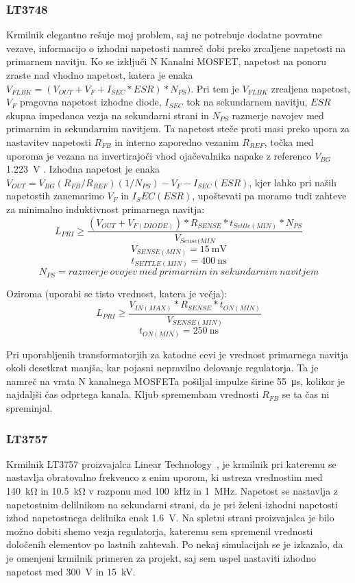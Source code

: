 \documentclass[a4paper,twoside,openright,12pt,Slovene]{book}
\begin{document}
	\subsubsection{LT3748} \label{LT3748}
Krmilnik elegantno rešuje moj problem, saj ne potrebuje dodatne povratne vezave, informacijo o izhodni napetosti namreč dobi preko zrcaljene napetosti na primarnem navitju. Ko se izključi N Kanalni MOSFET, napetost na ponoru zraste nad vhodno napetost, katera je enaka \(V_{FLBK} = (V_{OUT} + V_F + I_{SEC} * ESR) * N_{PS}) \). Pri tem je \(V_{FLBK}\) zrcaljena napetost, \(V_F\) pragovna napetost izhodne diode, \(I_{SEC}\) tok na sekundarnem navitju, \(ESR\) skupna impedanca vezja na sekundarni strani in \(N_{PS}\) razmerje navojev med primarnim in sekundarnim navitjem. Ta napetost steče proti masi preko upora za nastavitev napetosti \(R_{FB}\) in interno zaporedno vezanim \(R_{REF}\), točka med uporoma je vezana na invertirajoči vhod ojačevalnika napake z referenco \(V_{BG}\) \SI{1.223}{\volt} \cite{analog:LT3748}. Izhodna napetost je enaka \(V_{OUT} = V_{BG}(R_{FB} / R_{REF})(1 / N_{PS}) - V_F - I_{SEC} (ESR)\), kjer lahko pri naših napetostih zanemarimo \(V_F\) in \(I_SEC (ESR)\), upoštevati pa moramo tudi zahteve za minimalno induktivnost primarnega navitja:
\[L_{PRI} \geq \frac{(V_{OUT}+V_{F(DIODE)}) * R_{SENSE} * t_{Settle(MIN)} * N_{PS}}{V_{Sense(MIN}}\]
\[V_{SENSE(MIN)}=\SI{15}{\milli\volt}\]
\[t_{SETTLE(MIN)}=\SI{400}{\nano\second}\]
\[N_{PS}=razmerje \: ovojev \: med \: primarnim \: in \: sekundarnim \: navitjem \]

Oziroma (uporabi se tisto vrednost, katera je večja):
\[L_{PRI} \geq \frac{V_{IN(MAX)}*R_{SENSE}*t_{ON(MIN)}}{V_{SENSE(MIN)}}\]
\[t_{ON(MIN)}=\SI{250}{\nano\second}\]

Pri uporabljenih transformatorjih za katodne cevi je vrednost primarnega navitja okoli desetkrat manjša, kar pojasni nepravilno delovanje regulatorja. Ta je namreč na vrata N kanalnega MOSFETa pošiljal impulze širine \SI{55}{\micro\second}, kolikor je najdaljši čas odprtega kanala. Kljub spremembam vrednosti \(R_{FB}\) se ta čas ni spreminjal.

	\subsubsection{LT3757} \label{LT3757}
Krmilnik LT3757 proizvajalca Linear Technology~\cite{analog:LT3757}, je krmilnik pri kateremu se nastavlja obratovalno frekvenco z enim uporom, ki ustreza vrednostim med \SI{140}{\kilo\ohm} in \SI{10.5}{\kilo\ohm} v razponu med \SI{100} {\kilo\hertz} in \SI{1} {\mega\hertz}. Napetost se nastavlja z napetostnim delilnikom na sekundarni strani, da je pri želeni izhodni napetosti izhod napetostnega delilnika enak \SI{1.6} {\volt}. Na spletni strani proizvajalca je bilo možno dobiti shemo vezja regulatorja, kateremu sem spremenil vrednosti določenih elementov po lastnih zahtevah. Po nekaj simulacijah se je izkazalo, da je omenjeni krmilnik primeren za projekt, saj sem uspel nastaviti izhodno napetost med \SI{300}{\volt} in \SI{15}{\kilo\volt}. 
\end{document}
